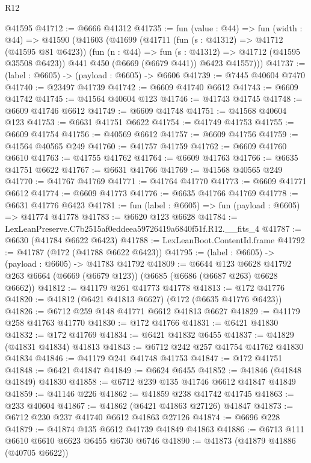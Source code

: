 \begin{lexlean}{R12}
\begin{coremodule}
    @41595
@41712 := @6666 @41312
@41735 := fun (value : @44) =>
  fun (width : @44) =>
  @41590
    (@41603
      (@41699
        (@41711
          (fun (s : @41312) => @41712 (@41595 @81 @6423))
          (fun (n : @44) => fun (s : @41312) => @41712 (@41595 @35508 @6423))
          @441
          @450
          (@6669 (@6679 @441))
          @6423
          @41557)))
@41737 := (label : @6605) -> (payload : @6605) -> @6606
@41739 := @7445 @40604 @7470
@41740 := @23497 @41739
@41742 := @6609 @41740 @6612
@41743 := @6609 @41742
@41745 := @41564 @40604 @123
@41746 := @41743 @41745
@41748 := @6609 @41746 @6612
@41749 := @6609 @41748
@41751 := @41568 @40604 @123
@41753 := @6631 @41751 @6622
@41754 := @41749 @41753
@41755 := @6609 @41754
@41756 := @40569 @6612
@41757 := @6609 @41756
@41759 := @41564 @40565 @249
@41760 := @41757 @41759
@41762 := @6609 @41760 @6610
@41763 := @41755 @41762
@41764 := @6609 @41763
@41766 := @6635 @41751 @6622
@41767 := @6631 @41766
@41769 := @41568 @40565 @249
@41770 := @41767 @41769
@41771 := @41764 @41770
@41773 := @6609 @41771 @6612
@41774 := @6609 @41773
@41776 := @6635 @41766 @41769
@41778 := @6631 @41776 @6423
@41781 := fun (label : @6605) => fun (payload : @6605) => @41774 @41778
@41783 := @6620 @123 @6628
@41784 := LexLeanPreserve.C7b2515af0eddeea59726419a6840f51f.R12.__fits_4
@41787 := @6630 (@41784 @6622 @6423)
@41788 := LexLeanBoot.ContentId.frame
@41792 := @41787 (@172 (@41788 @6622 @6423))
@41795 := (label : @6605) -> (payload : @6605) -> @41783 @41792
@41809 := @6644
    @123
    @6628
    @41792
    @263
    @6664
    (@6669 (@6679 @123))
    (@6685 (@6686 (@6687 @263) @6628 @6662))
@41812 := @41179 @261 @41773 @41778
@41813 := @172 @41776
@41820 := @41812 (@6421 @41813 @6627) (@172 (@6635 @41776 @6423))
@41826 := @6712 @259 @148 @41771 @6612 @41813 @6627
@41829 := @41179 @258 @41763 @41770
@41830 := @172 @41766
@41831 := @6421 @41830
@41832 := @172 @41769
@41834 := @6421 @41832 @6455
@41837 := @41829 (@41831 @41834) @41813
@41843 := @6712 @242 @257 @41754 @41762 @41830 @41834
@41846 := @41179 @241 @41748 @41753
@41847 := @172 @41751
@41848 := @6421 @41847
@41849 := @6624 @6455
@41852 := @41846 (@41848 @41849) @41830
@41858 := @6712 @239 @135 @41746 @6612 @41847 @41849
@41859 := @41146 @226
@41862 := @41859 @238 @41742 @41745
@41863 := @233 @40604
@41867 := @41862 (@6421 @41863 @27126) @41847
@41873 := @6712 @230 @237 @41740 @6612 @41863 @27126
@41874 := @6696 @228
@41879 := @41874 @135 @6612 @41739 @41849 @41863
@41886 := @6713 @111 @6610 @6610 @6623 @6455 @6730 @6746
@41890 := @41873 (@41879 @41886 (@40705 @6622))

\end{coremodule}
\end{lexlean}
